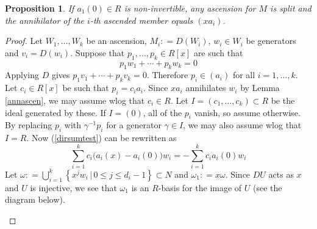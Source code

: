 \documentclass[11pt]{article}
\newtheorem{proposition}[theo]{Proposition}
\theoremstyle{definition}
\numberwithin{equation}{section}
\begin{document}
\begin{proposition}    \label{ascensionisdirect}   
If $ a_{1}(0) \in R $ is non-invertible, any ascension for $ M $  is  split  and the annihilator of the $ i $-th  ascended  member equals $ ( x a_{i} ) $. 
\end{proposition}      
\begin{proof} 
  Let $ W_{1}, \ldots , W_{k} $ be an ascension, $ M _{i} : = D(W_{i}) $,  $ w_{i} \in W_{i} $ be generators and $ v_{i} = D(w_{i}) $.    
Suppose that $ p_{1}, \ldots, p_{k} \in R[x] $ are such that 
\begin{equation} \label{dirsumtest}  p_{1} w_{1} +  \cdots + p_{k} w_{k} = 0  \end{equation}  
Applying $ D $ gives $  p_{1} v_{1} + \cdots + p_{k} v_{k} = 0 $. Therefore $ p_{i}  \in ( a_{i} ) $ for all $ i = 1, \ldots , k $. Let $ c_{i} \in R[x] $ be such that $ p_{i} = c_{i} a_{i} $. Since $ xa_{i} $ annihilates $ w_{i}  $ by Lemma \ref{annascen},  we may assume wlog that $ c_{i}   \in  R $.  Let $ I = (c_{1}, \ldots, c_{k}) \subset R $ be the ideal generated by these.  If $ I = (0) $, all of the $ p_{i} $ vanish, so assume otherwise. By replacing $ p_{i} $ with $  \gamma  ^{-1} p_{i} $ for a generator $ \gamma \in I $, we may also assume wlog  that    $ I = R $. Now (\ref{dirsumtest}) can be rewritten as
\begin{equation}  \label{dirsumtestconseq} \sum_{i=1}^{k}  c_{i} \big ( a_{i}(x) - a_{i}(0)  \big  )w_{i}  =    -  \sum_{i=1}^{k} c_{i} a_{i}(0) w_{i} 
\end{equation}   
Let $  \omega    : =  \bigcup _{ i =1 }^{k} \left \{ x^{j} w_{i} \, | \, 0 \leq j \leq d_{i}  -   1    \right \}  \subset N$ and $ \omega_{ 1 }    :   = x \omega  $.  Since $ DU $ acts as $ x $ and $ U $ is injective, we see that $ \omega  _   {  1  }   $ is an $ R $-basis for the image of $ U $ (see the diagram below).
\begin{center}
\begin{tikzcd}[ 
        ,every arrow/.append style={maps to}
        ,every label/.append style={font = \scriptsize}
] 
  

\end{tikzcd}
\end{center}
\end{proof}
\end{document}
